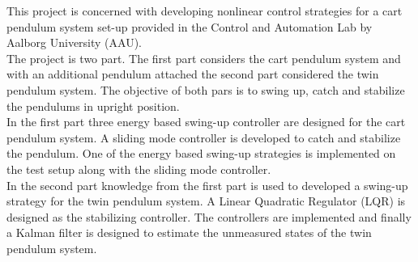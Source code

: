 %
This project is concerned with developing nonlinear control strategies for a cart pendulum system set-up provided in the Control and Automation Lab by Aalborg University (AAU).\\
The project is two part. The first part considers the cart pendulum system and with an additional pendulum attached the second part considered the twin pendulum system. The objective of both pars is to swing up, catch and stabilize the pendulums in upright position.\\
In the first part three energy based swing-up controller are designed for the cart pendulum system. A sliding mode controller is developed to catch and stabilize the pendulum. One of the energy based swing-up strategies is implemented on the test setup along with the sliding mode controller.\\
In the second part knowledge from the first part is used to developed a swing-up strategy for the twin pendulum system. A Linear Quadratic Regulator (LQR) is designed as the stabilizing controller. The controllers are implemented and finally a Kalman filter is designed to estimate the unmeasured states of the twin pendulum system.